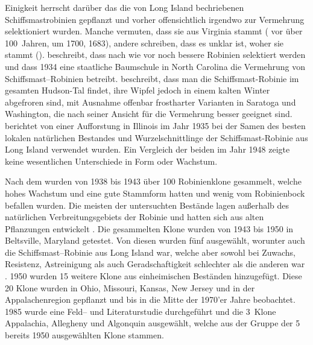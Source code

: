 \documentclass[twocolumn]{scrartcl}
\begin{document}
Einigkeit herrscht darüber das die von Long Island
bechriebenen Schiffsmastrobinien gepflanzt und vorher offensichtlich
irgendwo zur Vermehrung selektioniert wurden. Manche vermuten, dass sie
aus Virginia stammt (\citet{hicks1883robinie} vor über 100~Jahren,
\citet{raber1936shipmast} um 1700, \citet{detwiler1937robinie} 1683),
andere schreiben, dass es unklar ist, woher sie stammt
(\citet{raber1938robinie}). \citet{detwiler1937robinie} beschreibt,
dass nach wie vor noch bessere Robinien selektiert werden und dass
1934 eine staatliche Baumschule in North Carolina die Vermehrung von
Schiffsmast--Robinien betreibt.
\citet{cope1938robinie} beschreibt, dass man die Schiffsmast-Robinie im
gesamten Hudson-Tal findet, ihre Wipfel jedoch in einem kalten Winter
abgefroren sind, mit Ausnahme offenbar frostharter Varianten in
Saratoga und Washington, die nach seiner Ansicht für die Vermehrung
besser geeignet sind.
\citet{minckler1948robinie} berichtet von einer Aufforstung in Illinois
im Jahr 1935 bei der Samen des besten lokalen natürlichen Bestandes
und Wurzelschnittlinge der Schiffsmast-Robinie aus Long Island
verwendet wurden. Ein Vergleich der beiden im Jahr 1948 zeigte keine
wesentlichen Unterschiede in Form oder Wachstum.

Nach dem \citet{steinergroup1987robinie} wurden von 1938 bis 1943 über 100
Robinienklone gesammelt, welche hohes Wachstum und eine gute Stammform hatten
und wenig vom Robinienbock befallen wurden. Die meisten der untersuchten
Bestände lagen außerhalb des natürlichen Verbreitungsgebiets der Robinie und
hatten sich aus alten Pflanzungen entwickelt \citep{hopp1941robinie}. Die
gesammelten Klone wurden von 1943 bis 1950 in Beltsville, Maryland getestet. Von
diesen wurden fünf ausgewählt, worunter auch die Schiffsmast--Robinie aus Long
Island war, welche aber sowohl bei Zuwachs, Resistenz, Astreinigung als auch
Geradschaftigkeit schlechter als die anderen war \citep{santamour1960robinie}.
1950 wurden 15 weitere Klone aus einheimischen Beständen hinzugefügt. Diese 20
Klone wurden in Ohio, Missouri, Kansas, New Jersey und in der Appalachenregion
gepflanzt und bis in die Mitte der 1970'er Jahre beobachtet. 1985 wurde eine
Feld-- und Literaturstudie durchgeführt und die 3~Klone Appalachia, Allegheny
und Algonquin ausgewählt, welche aus der Gruppe der 5 bereits 1950 ausgewählten
Klone stammen.
\end{document}
